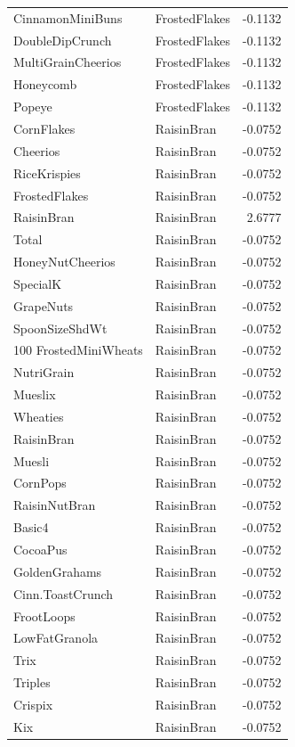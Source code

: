 \begin{longtable}{llr}
CinnamonMiniBuns & FrostedFlakes & -0.1132 \\
DoubleDipCrunch & FrostedFlakes & -0.1132 \\
MultiGrainCheerios & FrostedFlakes & -0.1132 \\
Honeycomb & FrostedFlakes & -0.1132 \\
Popeye & FrostedFlakes & -0.1132 \\
CornFlakes & RaisinBran & -0.0752 \\
Cheerios & RaisinBran & -0.0752 \\
RiceKrispies & RaisinBran & -0.0752 \\
FrostedFlakes & RaisinBran & -0.0752 \\
RaisinBran & RaisinBran & 2.6777 \\
Total & RaisinBran & -0.0752 \\
HoneyNutCheerios & RaisinBran & -0.0752 \\
SpecialK & RaisinBran & -0.0752 \\
GrapeNuts & RaisinBran & -0.0752 \\
SpoonSizeShdWt & RaisinBran & -0.0752 \\
100%
FrostedMiniWheats & RaisinBran & -0.0752 \\
NutriGrain & RaisinBran & -0.0752 \\
Mueslix & RaisinBran & -0.0752 \\
Wheaties & RaisinBran & -0.0752 \\
RaisinBran & RaisinBran & -0.0752 \\
Muesli & RaisinBran & -0.0752 \\
CornPops & RaisinBran & -0.0752 \\
RaisinNutBran & RaisinBran & -0.0752 \\
Basic4 & RaisinBran & -0.0752 \\
CocoaPus & RaisinBran & -0.0752 \\
GoldenGrahams & RaisinBran & -0.0752 \\
Cinn.ToastCrunch & RaisinBran & -0.0752 \\
FrootLoops & RaisinBran & -0.0752 \\
LowFatGranola & RaisinBran & -0.0752 \\
Trix & RaisinBran & -0.0752 \\
Triples & RaisinBran & -0.0752 \\
Crispix & RaisinBran & -0.0752 \\
Kix & RaisinBran & -0.0752 \\

\end{longtable}
